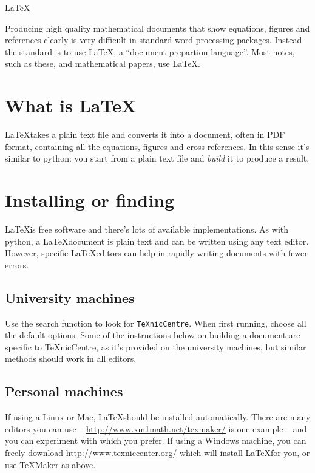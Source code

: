 \begin{chapter}{\LaTeX}

Producing high quality mathematical documents that show equations, figures and references clearly is very difficult in standard word processing packages. Instead the standard is to use \LaTeX, a ``document prepartion language''. Most notes, such as these, and mathematical papers, use \LaTeX.

\section{What is \LaTeX}

\LaTeX takes a plain text file and converts it into a document, often in PDF format, containing all the equations, figures and cross-references. In this sense it's similar to python: you start from a plain text file and \emph{build} it to produce a result.

\section{Installing or finding}

\LaTeX is free software and there's lots of available implementations. As with python, a \LaTeX document is plain text and can be written using any text editor. However, specific \LaTeX editors can help in rapidly writing documents with fewer errors.

\subsection{University machines}

Use the search function to look for \texttt{TeXnicCentre}. When first running, choose all the default options. Some of the instructions below on building a document are specific to TeXnicCentre, as it's provided on the university machines, but similar methods should work in all editors.

\subsection{Personal machines}

If using a Linux or Mac, \LaTeX should be installed automatically. There are many editors you can use -- \href{TeXMaker}{http://www.xm1math.net/texmaker/} is one example -- and you can experiment with which you prefer. If using a Windows machine, you can freely download \href{TeXnicCentre}{http://www.texniccenter.org/} which will install \LaTeX for you, or use TeXMaker as above.


\end{chapter}
